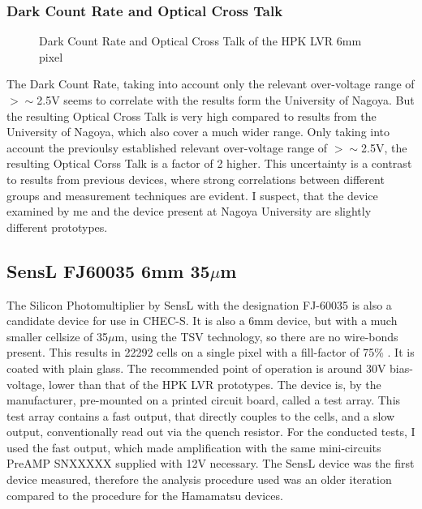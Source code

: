 \documentclass[article,type=msc,colorback,accentcolor=tud9c]{tudthesis}
\begin{document}
\subsubsection{Dark Count Rate and Optical Cross Talk}
\label{subsubsec:LVR6DCROCT}
\begin{figure}[h]
\begin{centering}
\caption{Dark Count Rate and Optical Cross Talk of the HPK LVR 6mm pixel}
\label{fig:LVR6_DCROCT}
\end{centering}
\end{figure}
The Dark Count Rate, taking into account only the relevant over-voltage range of $>\sim$2.5V seems to correlate with the results form the University of Nagoya. But the resulting Optical Cross Talk is very high compared to results from the University of Nagoya, which also cover a much wider range. Only taking into account the previoulsy established relevant over-voltage range of $>\sim$2.5V, the resulting Optical Corss Talk is a factor of 2 higher. This uncertainty is a contrast to results from previous devices, where strong correlations between different groups and measurement techniques are evident. I suspect, that the device examined by me and the device present at Nagoya University are slightly different prototypes.


\newpage
\subsection{SensL FJ60035 6mm 35$\mu$m}
The Silicon Photomultiplier by SensL with the designation FJ-60035 is also a candidate device for use in CHEC-S. It is also a 6mm device, but with a much smaller cellsize of 35$\mu$m, using the TSV technology, so there are no wire-bonds present. This results in 22292 cells on a single pixel with a fill-factor of 75\% . It is coated with plain glass. The recommended point of operation is around 30V bias-voltage, lower than that of the HPK LVR prototypes. The device is, by the manufacturer, pre-mounted on a printed circuit board, called a test array. This test array contains a fast output, that directly couples to the cells, and a slow output, conventionally read out via the quench resistor. For the conducted tests, I used the fast output, which made amplification with the same mini-circuits PreAMP SNXXXXX supplied with 12V necessary. The SensL device was the first device measured, therefore the analysis procedure used was an older iteration compared to the procedure for the Hamamatsu devices. 
\end{document}
